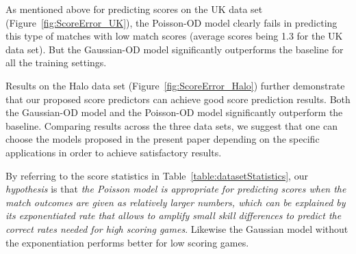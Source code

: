 As mentioned above for predicting scores on the UK data set (Figure~\ref{fig:ScoreError_UK}), the Poisson-OD model clearly fails in predicting this type of matches with low match scores (average scores being 1.3 for the UK data set). But the Gaussian-OD model significantly outperforms the baseline for all the training settings. 
\begin{center}
\begin{figure*}[t!]
 \centering
\caption{\small Results on the UK-PL, evaluated using score
prediction error (right column). Error bars indicate
standard errors.}
\label{fig:ScoreError_UK}
\end{figure*}
\end{center}

Results on the Halo data set (Figure~\ref{fig:ScoreError_Halo}) further demonstrate that our proposed score predictors can achieve good score prediction results. Both the Gaussian-OD model and the Poisson-OD model significantly outperform the baseline. Comparing results across the three data sets, we suggest that one can choose the models proposed in the present paper depending on the specific applications in order to achieve satisfactory results. 
\begin{center}
\begin{figure*}[t!]
 \centering
\caption{\small Results on the Halo 2 data set, evaluated using score
prediction error (right column). Error bars indicate
standard errors.}
\label{fig:ScoreError_Halo}
\end{figure*}
\end{center}


\COMMENT
By referring to the score
statistics in Table~\ref{table:datasetStatistics}, our {\it
hypothesis} is that {\it the Poisson model is appropriate for
predicting scores when the match outcomes are given as relatively
larger numbers, which can be explained by its exponentiated rate that
allows to amplify small skill differences to predict the correct rates
needed for high scoring games}. Likewise the Gaussian model without
the exponentiation performs better for low scoring games.

